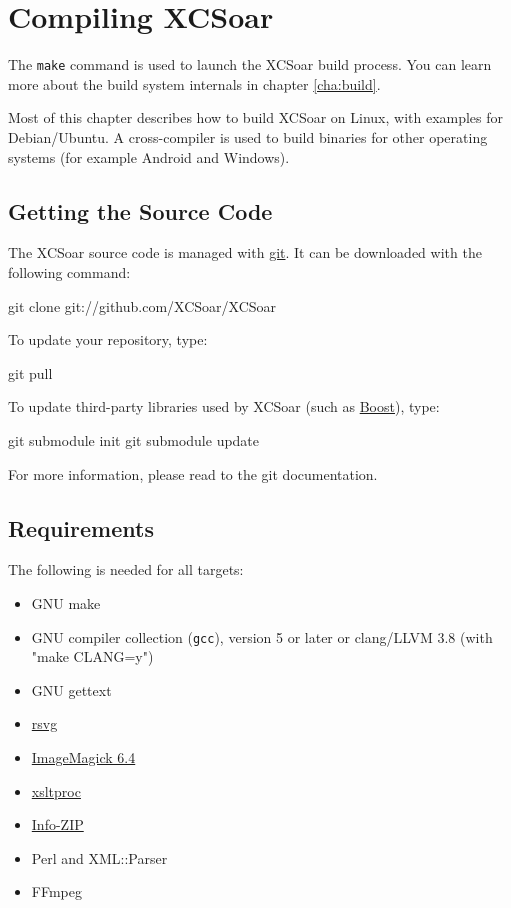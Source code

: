 \chapter{Compiling XCSoar}\label{cha:compiling}

The \texttt{make} command is used to launch the XCSoar build process.
You can learn more about the build system internals in chapter
\ref{cha:build}.

Most of this chapter describes how to build XCSoar on Linux, with
examples for Debian/Ubuntu.  A cross-compiler is used to build
binaries for other operating systems (for example Android and
Windows).

\section{Getting the Source Code}

The XCSoar source code is managed with
\href{http://git-scm.com/}{git}.  It can be downloaded with the
following command:

\begin{verbatim*}
git clone git://github.com/XCSoar/XCSoar
\end{verbatim*}

To update your repository, type:

\begin{verbatim*}
git pull
\end{verbatim*}

To update third-party libraries used by XCSoar (such as
\href{http://www.boost.org/}{Boost}), type:

\begin{verbatim*}
git submodule init
git submodule update
\end{verbatim*}

For more information, please read to the git documentation.

\section{Requirements}

The following is needed for all targets:

\begin{itemize}
\item GNU make
\item GNU compiler collection (\texttt{gcc}), version 5 or later
  or clang/LLVM 3.8 (with "make CLANG=y")
\item GNU gettext
\item \href{http://librsvg.sourceforge.net/)}{rsvg}
\item \href{http://www.imagemagick.org/}{ImageMagick 6.4}
\item \href{http://xmlsoft.org/XSLT/xsltproc2.html}{xsltproc}
\item \href{http://www.info-zip.org/}{Info-ZIP}
\item Perl and XML::Parser
\item FFmpeg
\end{itemize}

